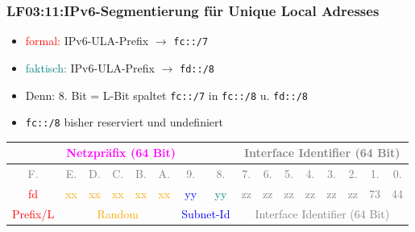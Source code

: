 \begin{frame}[fragile]  
  \frametitle{LF03:11:IPv6-Segmentierung für Unique Local Adresses}
  \vspace{0.2cm}
  \begin{tiny}

    \begin{itemize}
      \item \textcolor{red}{formal:} IPv6-ULA-Prefix $\rightarrow$ \texttt{fc::/7}
      \item \textcolor{teal}{faktisch:} IPv6-ULA-Prefix $\rightarrow$ \texttt{fd::/8}
      \item Denn: 8. Bit = L-Bit spaltet \texttt{fc::/7} in \texttt{fc::/8} u. \texttt{fd::/8}
      \item \texttt{fc::/8} bisher reserviert und undefiniert
    \end{itemize}

    \begin{center}
      \renewcommand{\arraystretch}{3}
      \begin{tabular}{|c|c|c|c|c|c|c|c|c|c|c|c|c|c|c|c|}
      \hline
       \multicolumn{8}{|c|}{\footnotesize{\textcolor{magenta}{Netzpräfix (64 Bit)}}} &
       \multicolumn{8}{c|}{\footnotesize{\textcolor{gray}{Interface Identifier (64 Bit)}}}\\
      \hline
      \textcolor{gray}{\tiny{F.}} & \textcolor{gray}{\tiny{E.}} &
          \textcolor{gray}{\tiny{D.}} & \textcolor{gray}{\tiny{C.}} &
            \textcolor{gray}{\tiny{B.}} & \textcolor{gray}{\tiny{A.}} &
              \textcolor{gray}{\tiny{9.}} & \textcolor{gray}{\tiny{8.}} &
                \textcolor{gray}{\tiny{7.}} & \textcolor{gray}{\tiny{6.}} &
                  \textcolor{gray}{\tiny{5.}} & \textcolor{gray}{\tiny{4.}} &
                    \textcolor{gray}{\tiny{3.}} & \textcolor{gray}{\tiny{2.}} &
                     \textcolor{gray}{\tiny{1.}} & \textcolor{gray}{\tiny{0.}} \\
  
      \hline
      \textcolor{red}{\tiny{fd}} & \textcolor{orange}{\tiny{xx}} &
          \textcolor{orange}{\tiny{xx}} & \textcolor{orange}{\tiny{xx}} &
            \textcolor{orange}{\tiny{xx}} & \textcolor{orange}{\tiny{xx}} &
              \textcolor{blue}{\tiny{yy}} & \textcolor{teal}{\tiny{yy}} &
                \textcolor{gray}{\tiny{zz}} & \textcolor{gray}{\tiny{zz}} &
                  \textcolor{gray}{\tiny{zz}} & \textcolor{gray}{\tiny{zz}} &
                    \textcolor{gray}{\tiny{zz}} & \textcolor{gray}{\tiny{zz}} &
                     \textcolor{gray}{\tiny{73}} & \textcolor{gray}{\tiny{44}} \\
      \hline
       \multicolumn{1}{|c|}{\tiny{\textcolor{red}{Prefix/L}}} &
       \multicolumn{5}{c|}{\footnotesize{\textcolor{orange}{Random}}} &
       \multicolumn{2}{c|}{\footnotesize{\textcolor{blue}{Subnet-Id}}} &
       \multicolumn{8}{c|}{\footnotesize{\textcolor{gray}{Interface Identifier (64 Bit)}}}\\   
       

\end{tabular}
\end{center}
\end{tiny}
\end{frame}
